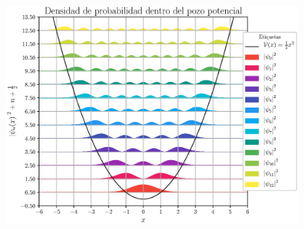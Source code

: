 \newpage
\begin{figure}[hbt!]
    \centering
    \includegraphics[scale=0.75]{Imagenes/Funciones_Normalizadas_01.eps}
\end{figure}


